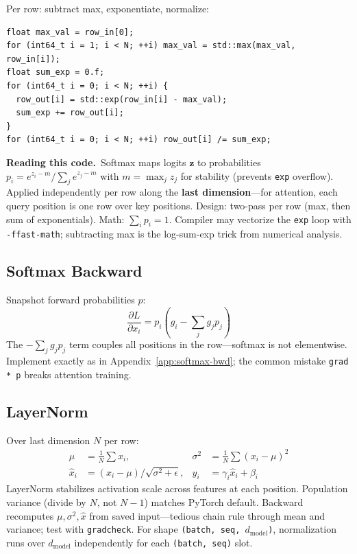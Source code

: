 \documentclass[11pt,a4paper]{article}
\newcommand{\explain}{\par\smallskip\noindent}
\newcommand{\exhead}{\textbf{Reading this code.}\ }
\begin{document}
Per row: subtract max, exponentiate, normalize:
\begin{lstlisting}[style=cpp]
float max_val = row_in[0];
for (int64_t i = 1; i < N; ++i) max_val = std::max(max_val, row_in[i]);
float sum_exp = 0.f;
for (int64_t i = 0; i < N; ++i) {
  row_out[i] = std::exp(row_in[i] - max_val);
  sum_exp += row_out[i];
}
for (int64_t i = 0; i < N; ++i) row_out[i] /= sum_exp;
\end{lstlisting}
\explain\exhead Softmax maps logits $\mathbf{z}$ to probabilities $p_i = e^{z_i - m}/\sum_j e^{z_j - m}$
with $m = \max_j z_j$ for stability (prevents \texttt{exp} overflow). Applied independently per
row along the \textbf{last dimension}---for attention, each query position is one row over key
positions. Design: two-pass per row (max, then sum of exponentials). Math: $\sum_i p_i = 1$.
Compiler may vectorize the \texttt{exp} loop with \texttt{-ffast-math}; subtracting max is the
log-sum-exp trick from numerical analysis.

\subsection{Softmax Backward}

Snapshot forward probabilities $p$:
\begin{equation}
  \frac{\partial L}{\partial x_i} = p_i \left(g_i - \sum_j g_j p_j\right)
\end{equation}
The $-\sum_j g_j p_j$ term couples all positions in the row---softmax is not elementwise.
Implement exactly as in Appendix~\ref{app:softmax-bwd}; the common mistake \texttt{grad * p}
breaks attention training.

\subsection{LayerNorm}

Over last dimension $N$ per row:
\begin{align}
  \mu &= \tfrac{1}{N}\sum x_i, &
  \sigma^2 &= \tfrac{1}{N}\sum (x_i - \mu)^2 \\
  \hat{x}_i &= (x_i - \mu) / \sqrt{\sigma^2 + \epsilon}, &
  y_i &= \gamma_i \hat{x}_i + \beta_i
\end{align}
LayerNorm stabilizes activation scale across features at each position. Population variance
(divide by $N$, not $N{-}1$) matches PyTorch default. Backward recomputes $\mu,\sigma^2,\hat{x}$
from saved input---tedious chain rule through mean and variance; test with \texttt{gradcheck}.
For shape \texttt{(batch, seq, $d_\text{model}$)}, normalization runs over $d_\text{model}$
independently for each \texttt{(batch, seq)} slot.
\end{document}
